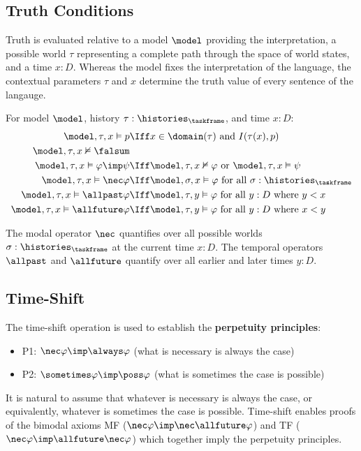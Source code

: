 \documentclass[../BimodalReference.tex]{subfiles}
\begin{document}
\subsection{Truth Conditions}

Truth is evaluated relative to a model $\model$ providing the interpretation, a possible world $\tau$ representing a complete path through the space of world states, and a time $x : D$.
Whereas the model fixes the interpretation of the language, the contextual parameters $\tau$ and $x$ determine the truth value of every sentence of the langauge.

\begin{definition}[Truth]
For model $\model$, history $\tau : \histories_{\taskframe}$, and time $x : D$:
\begin{align*}
  \model, \tau, x \vDash p &\Iff x \in \domain(\tau) \text{ and } I(\tau(x), p) \\
  \model, \tau, x \nvDash \falsum \\
  \model, \tau, x \vDash \varphi \imp \psi &\Iff
    \model, \tau, x \nvDash \varphi \text{ or } \model, \tau, x \vDash \psi \\
  \model, \tau, x \vDash \nec\varphi &\Iff
    \model, \sigma, x \vDash \varphi \text{ for all } \sigma : \histories_{\taskframe} \\
  \model, \tau, x \vDash \allpast\varphi &\Iff
    \model, \tau, y \vDash \varphi \text{ for all } y : D \text{ where } y < x \\
  \model, \tau, x \vDash \allfuture\varphi &\Iff
    \model, \tau, y \vDash \varphi \text{ for all } y : D \text{ where } x < y
\end{align*}
\end{definition}

\noindent
The modal operator $\nec$ quantifies over all possible worlds $\sigma : \histories_{\taskframe}$ at the current time $x : D$.
The temporal operators $\allpast$ and $\allfuture$ quantify over all earlier and later times $y : D$.


\subsection{Time-Shift}

The time-shift operation is used to establish the \textbf{perpetuity principles}:
\begin{itemize}
  \item P1: $\nec\varphi \imp \always\varphi$ (what is necessary is always the case)
  \item P2: $\sometimes\varphi \imp \poss\varphi$ (what is sometimes the case is possible)
\end{itemize}
It is natural to assume that whatever is necessary is always the case, or equivalently, whatever is sometimes the case is possible.
Time-shift enables proofs of the bimodal axioms MF ($\nec\varphi \imp \nec\allfuture\varphi$) and TF ($\nec\varphi \imp \allfuture\nec\varphi$) which together imply the perpetuity principles.
\end{document}
